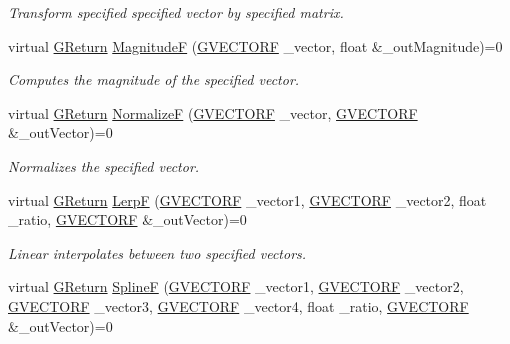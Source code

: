 \begin{DoxyCompactItemize}
\begin{DoxyCompactList}\small\item\em Transform specified specified vector by specified matrix. \end{DoxyCompactList}\item 
virtual \mbox{\hyperlink{namespace_g_w_a67a839e3df7ea8a5c5686613a7a3de21}{G\+Return}} \mbox{\hyperlink{class_g_w_1_1_m_a_t_h_1_1_g_vector_afa368c95bea737f3bd63baf14678d0a9}{MagnitudeF}} (\mbox{\hyperlink{struct_g_w_1_1_m_a_t_h_1_1_g_v_e_c_t_o_r_f}{G\+V\+E\+C\+T\+O\+RF}} \+\_\+vector, float \&\+\_\+out\+Magnitude)=0
\begin{DoxyCompactList}\small\item\em Computes the magnitude of the specified vector. \end{DoxyCompactList}\item 
virtual \mbox{\hyperlink{namespace_g_w_a67a839e3df7ea8a5c5686613a7a3de21}{G\+Return}} \mbox{\hyperlink{class_g_w_1_1_m_a_t_h_1_1_g_vector_a736e7cf06c1226df11c092e67f0689ab}{NormalizeF}} (\mbox{\hyperlink{struct_g_w_1_1_m_a_t_h_1_1_g_v_e_c_t_o_r_f}{G\+V\+E\+C\+T\+O\+RF}} \+\_\+vector, \mbox{\hyperlink{struct_g_w_1_1_m_a_t_h_1_1_g_v_e_c_t_o_r_f}{G\+V\+E\+C\+T\+O\+RF}} \&\+\_\+out\+Vector)=0
\begin{DoxyCompactList}\small\item\em Normalizes the specified vector. \end{DoxyCompactList}\item 
virtual \mbox{\hyperlink{namespace_g_w_a67a839e3df7ea8a5c5686613a7a3de21}{G\+Return}} \mbox{\hyperlink{class_g_w_1_1_m_a_t_h_1_1_g_vector_aa94d4c2613539433865e684edbaf96b3}{LerpF}} (\mbox{\hyperlink{struct_g_w_1_1_m_a_t_h_1_1_g_v_e_c_t_o_r_f}{G\+V\+E\+C\+T\+O\+RF}} \+\_\+vector1, \mbox{\hyperlink{struct_g_w_1_1_m_a_t_h_1_1_g_v_e_c_t_o_r_f}{G\+V\+E\+C\+T\+O\+RF}} \+\_\+vector2, float \+\_\+ratio, \mbox{\hyperlink{struct_g_w_1_1_m_a_t_h_1_1_g_v_e_c_t_o_r_f}{G\+V\+E\+C\+T\+O\+RF}} \&\+\_\+out\+Vector)=0
\begin{DoxyCompactList}\small\item\em Linear interpolates between two specified vectors. \end{DoxyCompactList}\item 
virtual \mbox{\hyperlink{namespace_g_w_a67a839e3df7ea8a5c5686613a7a3de21}{G\+Return}} \mbox{\hyperlink{class_g_w_1_1_m_a_t_h_1_1_g_vector_a8e55aed1762134abcfd485099813ae64}{SplineF}} (\mbox{\hyperlink{struct_g_w_1_1_m_a_t_h_1_1_g_v_e_c_t_o_r_f}{G\+V\+E\+C\+T\+O\+RF}} \+\_\+vector1, \mbox{\hyperlink{struct_g_w_1_1_m_a_t_h_1_1_g_v_e_c_t_o_r_f}{G\+V\+E\+C\+T\+O\+RF}} \+\_\+vector2, \mbox{\hyperlink{struct_g_w_1_1_m_a_t_h_1_1_g_v_e_c_t_o_r_f}{G\+V\+E\+C\+T\+O\+RF}} \+\_\+vector3, \mbox{\hyperlink{struct_g_w_1_1_m_a_t_h_1_1_g_v_e_c_t_o_r_f}{G\+V\+E\+C\+T\+O\+RF}} \+\_\+vector4, float \+\_\+ratio, \mbox{\hyperlink{struct_g_w_1_1_m_a_t_h_1_1_g_v_e_c_t_o_r_f}{G\+V\+E\+C\+T\+O\+RF}} \&\+\_\+out\+Vector)=0

\end{DoxyCompactItemize}
